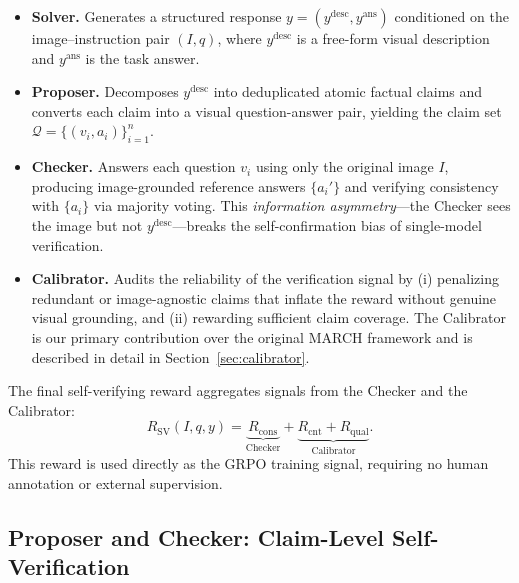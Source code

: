 \begin{itemize}[leftmargin=1.5em,itemsep=2pt]
  \item \textbf{Solver.} Generates a structured response
        $y=(y^{\mathrm{desc}}, y^{\mathrm{ans}})$ conditioned on the
        image--instruction pair $(I, q)$, where $y^{\mathrm{desc}}$
        is a free-form visual description and $y^{\mathrm{ans}}$ is
        the task answer.

  \item \textbf{Proposer.} Decomposes $y^{\mathrm{desc}}$ into
        deduplicated atomic factual claims and converts each claim into
        a visual question-answer pair, yielding the claim set
        $\mathcal{Q} = \{(v_i, a_i)\}_{i=1}^{n}$.

  \item \textbf{Checker.} Answers each question $v_i$ using only the
        original image $I$, producing image-grounded reference answers
        $\{a_i'\}$ and verifying consistency with $\{a_i\}$ via
        majority voting. This \emph{information asymmetry}---the
        Checker sees the image but not $y^{\mathrm{desc}}$---breaks
        the self-confirmation bias of single-model verification.

  \item \textbf{Calibrator.} Audits the reliability of the
        verification signal by (i) penalizing redundant or
        image-agnostic claims that inflate the reward without genuine
        visual grounding, and (ii) rewarding sufficient claim
        coverage. The Calibrator is our primary contribution over the
        original MARCH framework and is described in detail in
        Section~\ref{sec:calibrator}.
\end{itemize}

The final self-verifying reward aggregates signals from the Checker and
the Calibrator:
\begin{equation}
    R_{\mathrm{SV}}(I,q,y)
    = \underbrace{R_{\mathrm{cons}}}_{\text{Checker}}
    + \underbrace{R_{\mathrm{cnt}} + R_{\mathrm{qual}}}_{\text{Calibrator}}.
    \label{eq:reward_total}
\end{equation}
This reward is used directly as the GRPO training signal,
requiring no human annotation or external supervision.


\subsection{Proposer and Checker: Claim-Level Self-Verification}
\label{sec:claim_level_verification}

